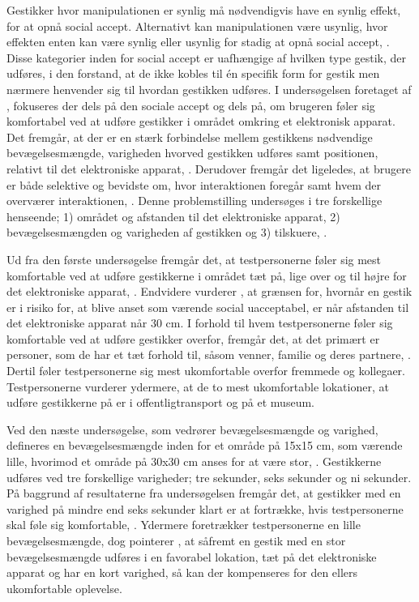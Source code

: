Gestikker hvor manipulationen er synlig må nødvendigvis have en synlig effekt, for at opnå social accept. Alternativt kan manipulationen være usynlig, hvor effekten enten kan være synlig eller usynlig for stadig at opnå social accept, \parencite[s. 278]{PDF:WouldYouDoThat}. Disse kategorier inden for social accept er uafhængige af hvilken type gestik, der udføres, i den forstand, at de ikke kobles til én specifik form for gestik men nærmere henvender sig til hvordan gestikken udføres.\blankline
%
I undersøgelsen foretaget af \textcite[s. 193]{PDF:AreYouComfortableDoingThat}, fokuseres der dels på den sociale accept og dels på, om brugeren føler sig komfortabel ved at udføre gestikker i området omkring et elektronisk apparat. Det fremgår, at der er en stærk forbindelse mellem gestikkens nødvendige bevægelsesmængde, varigheden hvorved gestikken udføres samt positionen, relativt til det elektroniske apparat, \parencite[s. 193]{PDF:AreYouComfortableDoingThat}. Derudover fremgår det ligeledes, at brugere er både selektive og bevidste om, hvor interaktionen foregår samt hvem der overværer interaktionen, \parencite[s. 193]{PDF:AreYouComfortableDoingThat}. Denne problemstilling undersøges i tre forskellige henseende; 1) området og afstanden til det elektroniske apparat, 2) bevægelsesmængden og varigheden af gestikken og 3) tilskuere, \parencite[ss. 195-200]{PDF:AreYouComfortableDoingThat}. 

Ud fra den første undersøgelse fremgår det, at testpersonerne føler sig mest komfortable ved at udføre gestikkerne i området tæt på, lige over og til højre for det elektroniske apparat, \parencite[s. 197]{PDF:AreYouComfortableDoingThat}. Endvidere vurderer \textcite[s. 201]{PDF:AreYouComfortableDoingThat}, at grænsen for, hvornår en gestik er i risiko for, at blive anset som værende social uacceptabel, er når afstanden til det elektroniske apparat når 30 cm. I forhold til hvem testpersonerne føler sig komfortable ved at udføre gestikker overfor, fremgår det, at det primært er personer, som de har et tæt forhold til, såsom venner, familie og deres partnere, \parencite[s. 196]{PDF:AreYouComfortableDoingThat}. Dertil føler testpersonerne sig mest ukomfortable overfor fremmede og kollegaer. Testpersonerne vurderer ydermere, at de to mest ukomfortable lokationer, at udføre gestikkerne på er i offentligtransport og på et museum. 

Ved den næste undersøgelse, som vedrører bevægelsesmængde og varighed, defineres en bevægelsesmængde inden for et område på 15x15 cm, som værende lille, hvorimod et område på 30x30 cm anses for at være stor, \parencite[s. 198]{PDF:AreYouComfortableDoingThat}. Gestikkerne udføres ved tre forskellige varigheder; tre sekunder, seks sekunder og ni sekunder. På baggrund af resultaterne fra undersøgelsen fremgår det, at gestikker med en varighed på mindre end seks sekunder klart er at fortrække, hvis testpersonerne skal føle sig komfortable, \parencite[s. 199]{PDF:AreYouComfortableDoingThat}. Ydermere foretrækker testpersonerne en lille bevægelsesmængde, dog pointerer \textcite[s. 199]{PDF:AreYouComfortableDoingThat}, at såfremt en gestik med en stor bevægelsesmængde udføres i en favorabel lokation, tæt på det elektroniske apparat og har en kort varighed, så kan der kompenseres for den ellers ukomfortable oplevelse. 

